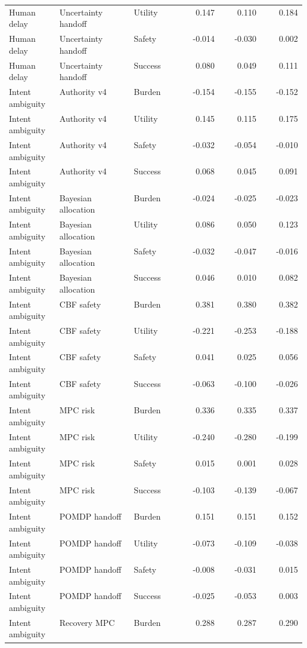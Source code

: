 \documentclass{article}
\begin{document}
\begin{center}
\begin{longtable}{p{0.17\linewidth}p{0.25\linewidth}p{0.16\linewidth}rrr}
Human delay & Uncertainty handoff & Utility & 0.147 & 0.110 & 0.184\\
Human delay & Uncertainty handoff & Safety & -0.014 & -0.030 & 0.002\\
Human delay & Uncertainty handoff & Success & 0.080 & 0.049 & 0.111\\
Intent ambiguity & Authority v4 & Burden & -0.154 & -0.155 & -0.152\\
Intent ambiguity & Authority v4 & Utility & 0.145 & 0.115 & 0.175\\
Intent ambiguity & Authority v4 & Safety & -0.032 & -0.054 & -0.010\\
Intent ambiguity & Authority v4 & Success & 0.068 & 0.045 & 0.091\\
Intent ambiguity & Bayesian allocation & Burden & -0.024 & -0.025 & -0.023\\
Intent ambiguity & Bayesian allocation & Utility & 0.086 & 0.050 & 0.123\\
Intent ambiguity & Bayesian allocation & Safety & -0.032 & -0.047 & -0.016\\
Intent ambiguity & Bayesian allocation & Success & 0.046 & 0.010 & 0.082\\
Intent ambiguity & CBF safety & Burden & 0.381 & 0.380 & 0.382\\
Intent ambiguity & CBF safety & Utility & -0.221 & -0.253 & -0.188\\
Intent ambiguity & CBF safety & Safety & 0.041 & 0.025 & 0.056\\
Intent ambiguity & CBF safety & Success & -0.063 & -0.100 & -0.026\\
Intent ambiguity & MPC risk & Burden & 0.336 & 0.335 & 0.337\\
Intent ambiguity & MPC risk & Utility & -0.240 & -0.280 & -0.199\\
Intent ambiguity & MPC risk & Safety & 0.015 & 0.001 & 0.028\\
Intent ambiguity & MPC risk & Success & -0.103 & -0.139 & -0.067\\
Intent ambiguity & POMDP handoff & Burden & 0.151 & 0.151 & 0.152\\
Intent ambiguity & POMDP handoff & Utility & -0.073 & -0.109 & -0.038\\
Intent ambiguity & POMDP handoff & Safety & -0.008 & -0.031 & 0.015\\
Intent ambiguity & POMDP handoff & Success & -0.025 & -0.053 & 0.003\\
Intent ambiguity & Recovery MPC & Burden & 0.288 & 0.287 & 0.290\\

\end{longtable}
\end{center}
\end{document}
